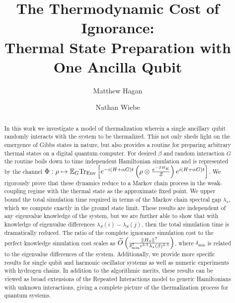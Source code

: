 \documentclass[
 amsmath,amssymb,
 aps,
onecolumn, 
nofootinbib]{revtex4-2}
\begin{document}
\title{ {The Thermodynamic Cost of Ignorance:} \\
Thermal State Preparation with One Ancilla Qubit}

\author{Matthew Hagan}

\author{Nathan Wiebe}
%
%
%


\begin{abstract}
  In this work we investigate a model of thermalization wherein a single
ancillary qubit randomly interacts with the system to be thermalized. This not
only sheds light on the emergence of Gibbs states in nature, but also provides
a routine for preparing arbitrary thermal states on a digital quantum computer.
For desired $\beta$ and random interaction $G$ the routine boils down to time
independent Hamiltonian simulation and is represented by the channel $\Phi :
\rho \mapsto \mathbb{E}_G {\rm Tr}_{\rm Env} \left[ e^{-i(H + \alpha G)t}
\left(\rho \otimes \frac{e^{-\beta H_E}}{\mathcal{Z}}\right) e^{i (H + \alpha
G)t} \right]$. We rigorously prove that these dynamics reduce to a Markov chain
process in the weak-coupling regime with the thermal state as the approximate
fixed point. We upper bound the total simulation time required in terms of the
Markov chain spectral gap $\lambda_\star$, which we compute exactly in the
ground state limit. These results are independent of any eigenvalue knowledge
of the system, but we are further able to show that with knowledge of
eigenvalue differences $\lambda_S(i) - \lambda_S(j)$, then the total simulation
time is dramatically reduced. The ratio of the complete ignorance simulation
cost to the perfect knowledge simulation cost scales as $\widetilde{O}
\left({\frac{\|{H_S}\|^7}{\delta_{\rm min}^7 \epsilon^{3.5}
\lambda_\star(\beta)^{3.5}}}\right)$, where $\delta_{\min}$ is related to the
eigenvalue differences of the system. Additionally, we provide more specific
results for single qubit and harmonic oscillator systems as well as numeric
experiments with hydrogen chains. In addition to the algorithmic merits, these
results can be viewed as broad extensions of the Repeated Interactions model to
generic Hamiltonians with unknown interactions, giving a complete picture of
the thermalization process for quantum systems.

\end{abstract}
\end{document}
